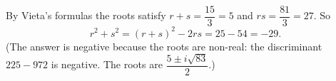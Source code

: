 By Vieta's formulas the roots satisfy $r+s=\dfrac{15}3=5$ and $rs=\dfrac{81}3=27$. So
\[r^2+s^2=(r+s)^2-2rs=25-54=\boxed{-29}.\]
(The answer is negative because the roots are non-real: the discriminant $225-972$ is negative. The roots are $\dfrac{5\pm i\sqrt{83}}{2}$.)
